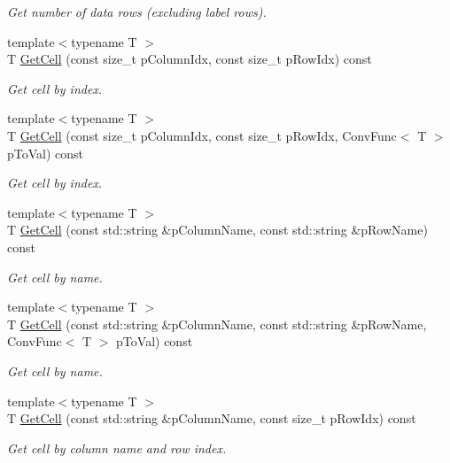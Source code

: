 \begin{DoxyCompactItemize}
\begin{DoxyCompactList}\small\item\em Get number of data rows (excluding label rows). \end{DoxyCompactList}\item 
{\footnotesize template$<$typename T $>$ }\\T \hyperlink{classrapidcsv_1_1Document_a57574b0b63080f7cc270a0ca1e092676}{Get\+Cell} (const size\+\_\+t p\+Column\+Idx, const size\+\_\+t p\+Row\+Idx) const
\begin{DoxyCompactList}\small\item\em Get cell by index. \end{DoxyCompactList}\item 
{\footnotesize template$<$typename T $>$ }\\T \hyperlink{classrapidcsv_1_1Document_a475e75a7292c3a0367b4bce92c9404f5}{Get\+Cell} (const size\+\_\+t p\+Column\+Idx, const size\+\_\+t p\+Row\+Idx, Conv\+Func$<$ T $>$ p\+To\+Val) const
\begin{DoxyCompactList}\small\item\em Get cell by index. \end{DoxyCompactList}\item 
{\footnotesize template$<$typename T $>$ }\\T \hyperlink{classrapidcsv_1_1Document_a166f1e2052d1da87e37f84d104070d05}{Get\+Cell} (const std\+::string \&p\+Column\+Name, const std\+::string \&p\+Row\+Name) const
\begin{DoxyCompactList}\small\item\em Get cell by name. \end{DoxyCompactList}\item 
{\footnotesize template$<$typename T $>$ }\\T \hyperlink{classrapidcsv_1_1Document_a9ffdef4e04691991470df4c49b7133f1}{Get\+Cell} (const std\+::string \&p\+Column\+Name, const std\+::string \&p\+Row\+Name, Conv\+Func$<$ T $>$ p\+To\+Val) const
\begin{DoxyCompactList}\small\item\em Get cell by name. \end{DoxyCompactList}\item 
{\footnotesize template$<$typename T $>$ }\\T \hyperlink{classrapidcsv_1_1Document_a93d4a249d7d193bfdc0874ef4e2e716c}{Get\+Cell} (const std\+::string \&p\+Column\+Name, const size\+\_\+t p\+Row\+Idx) const
\begin{DoxyCompactList}\small\item\em Get cell by column name and row index. \end{DoxyCompactList}\item 

\end{DoxyCompactItemize}
